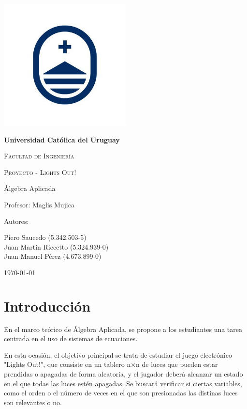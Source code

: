 \documentclass{article}
\begin{document}
    \begin{titlepage}
        \centering
        {\includegraphics[width=0.5\textwidth]{logo2}\par}
        {\bfseries\LARGE Universidad Católica del Uruguay \par}
        \vspace{0.3cm}
        {\scshape\Large Facultad de Ingeniería \par}
        \vspace{0.3cm}
        {\scshape\Huge Proyecto - Lights Out!\par}
        \vspace{1cm}
        {\Large Álgebra Aplicada \par}
        {\Large Profesor: Maglis Mujica \par}
        \vfill
        {\Large Autores: \par}
        {\Large Piero Saucedo (5.342.503-5)\\Juan Martín Riccetto (5.324.939-0)\\Juan Manuel Pérez (4.673.899-0) \par}
        \vfill
        {\Large \today \par}
    \end{titlepage}

    \section{Introducción}\label{sec:introduccion}
    En el marco teórico de Álgebra Aplicada, se propone a los estudiantes una tarea centrada en el uso de sistemas de ecuaciones.

    En esta ocasión, el objetivo principal se trata de estudiar el juego electrónico "Lights Out!", que consiste en un tablero n×n de luces que pueden estar prendidas o apagadas de forma aleatoria, y el jugador deberá alcanzar un estado en el que todas las luces estén apagadas.
    Se buscará verificar si ciertas variables, como el orden o el número de veces en el que son presionadas las distinas luces son relevantes o no.
\end{document}
